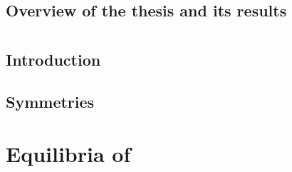 

\section{Overview of the thesis and its results}
\label{sect:overview}
    

%
%
%

%
%
%
%
%
%

\chapter{\KSe}
\label{chap:ks}

\section{Introduction}
\label{sect:KSintro}
    

\section{Symmetries}
\label{sect:KSsym}
    

\chapter{Equilibria of \KSe}
\label{chap:KSmichelson}
    

